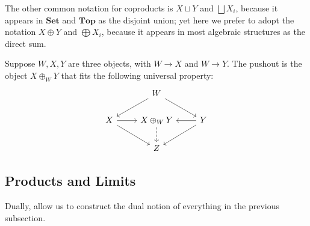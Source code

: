 \begin{remark}
    The other common notation for coproducts is \(X \sqcup Y\) and \(\bigsqcup X_i\),
    because it appears in \(\textbf{Set}\) and \(\textbf{Top}\) as the disjoint union;
    yet here we prefer to adopt the notation \(X \oplus Y\) and \(\bigoplus X_i\),
    because it appears in most algebraic structures as the direct sum.
\end{remark}


\begin{definition}
    Suppose \(W,X,Y\) are three objects, with \(W \to X\) and \(W \to Y\).
    The pushout is the object \(X \oplus_W Y\) that fits the following universal property:
    \begin{equation*}
        \begin{tikzcd}
            & W \arrow{dl} \arrow{dr} \\
            X \arrow{r} \arrow{dr} & X \oplus_W Y \arrow[dashrightarrow]{d} & Y \arrow{l} \arrow{dl} \\
            & Z
        \end{tikzcd}
    \end{equation*}
\end{definition}


\subsection*{Products and Limits}

\begin{remark}
    Dually, allow us to construct the dual notion of everything in the previous subsection.
\end{remark}

